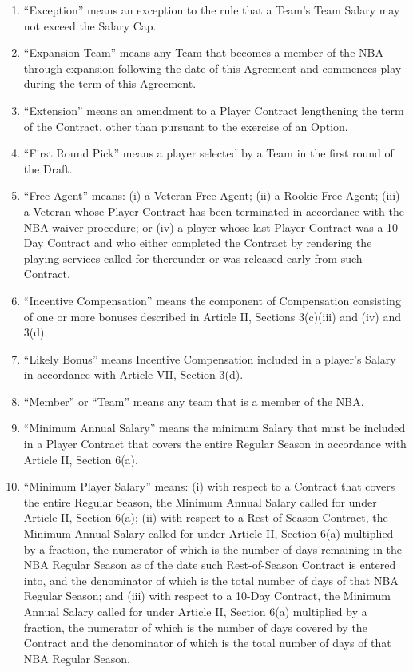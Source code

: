 \documentclass[
]{book}
\begin{document}
\begin{enumerate}
\item
  ``Exception'' means an exception to the rule that a Team's Team Salary may not exceed the Salary Cap.
\item
  ``Expansion Team'' means any Team that becomes a member of the NBA through expansion following the date of this Agreement and commences play during the term of this Agreement.
\item
  ``Extension'' means an amendment to a Player Contract lengthening the term of the Contract, other than pursuant to the exercise of an Option.
\item
  ``First Round Pick'' means a player selected by a Team in the first round of the Draft.
\item
  ``Free Agent'' means: (i) a Veteran Free Agent; (ii) a Rookie Free Agent; (iii) a Veteran whose Player Contract has been terminated in accordance with the NBA waiver procedure; or (iv) a player whose last Player Contract was a 10-Day Contract and who either completed the Contract by rendering the playing services called for thereunder or was released early from such Contract.
\item
  ``Incentive Compensation'' means the component of Compensation consisting of one or more bonuses described in Article II, Sections 3(c)(iii) and (iv) and 3(d).
\item
  ``Likely Bonus'' means Incentive Compensation included in a player's Salary in accordance with Article VII, Section 3(d).
\item
  ``Member'' or ``Team'' means any team that is a member of the NBA.
\item
  ``Minimum Annual Salary'' means the minimum Salary that must be included in a Player Contract that covers the entire Regular Season in accordance with Article II, Section 6(a).
\item
  ``Minimum Player Salary'' means: (i) with respect to a Contract that covers the entire Regular Season, the Minimum Annual Salary called for under Article II, Section 6(a); (ii) with respect to a Rest-of-Season Contract, the Minimum Annual Salary called for under Article II, Section 6(a) multiplied by a fraction, the numerator of which is the number of days remaining in the NBA Regular Season as of the date such Rest-of-Season Contract is entered into, and the denominator of which is the total number of days of that NBA Regular Season; and (iii) with respect to a 10-Day Contract, the Minimum Annual Salary called for under Article II, Section 6(a) multiplied by a fraction, the numerator of which is the number of days covered by the Contract and the denominator of which is the total number of days of that NBA Regular Season.

\end{enumerate}
\end{document}
